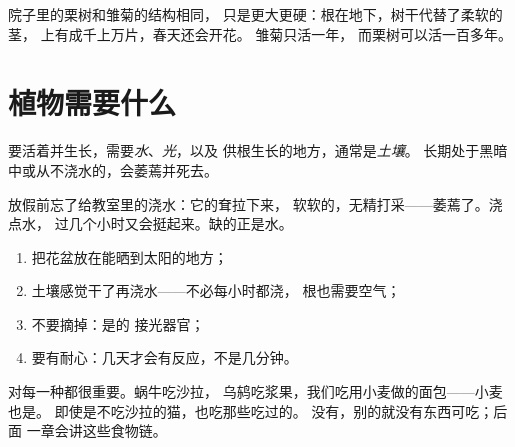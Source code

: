 \begin{example}[栗树]\label{ex:g1:plants-around-us:tree}
院子里的栗树和雏菊的结构相同，
只是更大更硬：根在地下，树干代替了柔软的茎，
上有成千上万片，春天还会开花。
雏菊只活一年，
而栗树可以活一百多年。
\end{example}

\section{植物需要什么}

\begin{proposition}[植物的需求]\label{prop:g1:plants-around-us:needs}
要活着并生长，需要\emph{水}、\emph{光}，以及
供根生长的地方，通常是\emph{土壤}。
长期处于黑暗中或从不浇水的，会萎蔫并死去。
\end{proposition}
\admitted

\begin{example}[被遗忘的植物]\label{ex:g1:plants-around-us:wilt}
放假前忘了给教室里的浇水：它的耷拉下来，
软软的，无精打采——萎蔫了。浇点水，
过几个小时又会挺起来。缺的正是水。
\end{example}

\begin{method}[照顾植物]\label{met:g1:plants-around-us:care}
\begin{enumerate}
  \item 把花盆放在能晒到太阳的地方；
  \item 土壤感觉干了再浇水——不必每小时都浇，
        根也需要空气；
  \item 不要摘掉：是的
        接光器官；
  \item 要有耐心：几天才会有反应，不是几分钟。
\end{enumerate}
\end{method}

\begin{remark}[植物养活所有人]\label{rem:g1:plants-around-us:food}
对每一种都很重要。蜗牛吃沙拉，
乌鸫吃浆果，我们吃用小麦做的面包——小麦也是。
即使是不吃沙拉的猫，也吃那些吃过的。
没有，别的就没有东西可吃；后面
一章会讲这些食物链。
\end{remark}

